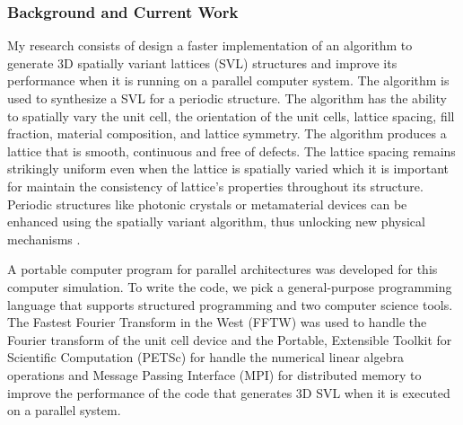 \documentclass[a4paper, 11pt]{article}
\begin{document}
\begin{small}
\subsubsection*{Background and Current Work}
My research consists of design a faster implementation of an algorithm to generate 3D spatially variant lattices (SVL) structures
and improve its performance when it is running on a parallel computer system. 
The algorithm is used to synthesize a SVL for a periodic structure. The algorithm has the ability to spatially vary the unit
cell, the orientation of the unit cells, lattice spacing, fill fraction, material composition, and lattice symmetry.
The algorithm produces a lattice that is smooth, continuous and free of defects.
The lattice spacing remains strikingly uniform even when the lattice is spatially varied which it is important for maintain the 
consistency of lattice's properties throughout its structure. Periodic structures like photonic crystals or metamaterial devices
can be enhanced using the spatially variant algorithm, thus unlocking new physical mechanisms \cite{Rumpf_Synthesis_SVL_2012, SV_Periodic_Structures_in_Electromagnetic_2015}.

A portable computer program for parallel architectures was developed for this computer simulation. To write the code, we pick a general-purpose programming language
that supports structured programming and two computer science tools. The Fastest Fourier Transform in the West (FFTW) was used to handle the Fourier transform of the
unit cell device and the Portable, Extensible Toolkit for Scientific Computation (PETSc) for handle the numerical linear algebra operations
and Message Passing Interface (MPI) for distributed memory to improve the performance of the code that generates 3D SVL when it is executed on a parallel system. 


\end{small}
\end{document}
